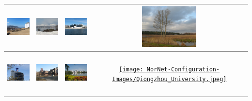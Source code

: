 \begin{small}
\begin{center}
\begin{longtable}{|c|c|c|c|}
 \hyperref[sec:NTNU]{\includegraphics[keepaspectratio,width=9em,height=6em]{NorNet-Configuration-Images/Universitetet_i_Trondheim.jpeg}} & \hyperref[sec:HiN]{\includegraphics[keepaspectratio,width=9em,height=6em]{NorNet-Configuration-Images/Hoegskolen_i_Narvik.jpeg}} & \hyperref[sec:HiOA]{\includegraphics[keepaspectratio,width=9em,height=6em]{NorNet-Configuration-Images/Hoegskolen_i_Oslo_og_Akershus.jpeg}} & \hyperref[sec:KAU]{\includegraphics[keepaspectratio,width=9em,height=6em]{NorNet-Configuration-Images/Karlstads_Universitet.jpeg}} \\ \hline
 \hyperref[sec:TUKL]{\includegraphics[keepaspectratio,width=9em,height=6em]{NorNet-Configuration-Images/Universitaet_Kaiserslautern.jpeg}} & \hyperref[sec:UDE]{\includegraphics[keepaspectratio,width=9em,height=6em]{NorNet-Configuration-Images/Universitaet_Duisburg-Essen.jpeg}} & \hyperref[sec:HU]{\includegraphics[keepaspectratio,width=9em,height=6em]{NorNet-Configuration-Images/Hainan_University.jpeg}} & \hyperref[sec:QU]{\texttt{[image: NorNet-Configuration-Images/Qiongzhou\_University.jpeg]}} \\ \hline

\end{longtable}
\end{center}
\end{small}
